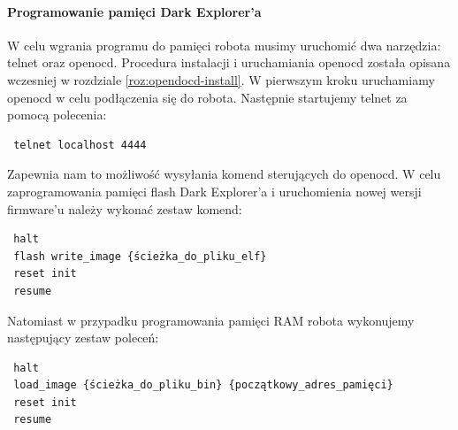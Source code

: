\paragraph{Programowanie pamięci Dark Explorer'a}
W celu wgrania programu do pamięci robota musimy uruchomić dwa narzędzia: telnet
oraz openocd. Procedura instalacji i uruchamiania openocd została opisana
wczesniej w rozdziale \ref{roz:opendocd-install}. W pierwszym kroku uruchamiamy
openocd w celu podłączenia się do robota. Następnie startujemy telnet za pomocą
polecenia:

\begin{verbatim}
 telnet localhost 4444
\end{verbatim}

Zapewnia nam to możliwość wysyłania komend sterujących do openocd. W celu
zaprogramowania pamięci flash Dark Explorer'a i uruchomienia nowej wersji
firmware'u należy wykonać zestaw komend:

\begin{verbatim}
 halt
 flash write_image {ścieżka_do_pliku_elf}
 reset init
 resume
\end{verbatim}

Natomiast w przypadku programowania pamięci RAM robota wykonujemy następujący
zestaw poleceń:

\begin{verbatim}
 halt
 load_image {ścieżka_do_pliku_bin} {początkowy_adres_pamięci}
 reset init
 resume
\end{verbatim}